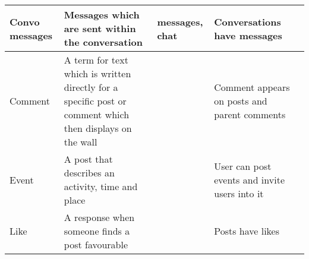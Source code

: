 \begin{center}
\begin{tabular}{| l | l | l | l | l |}
    Convo messages   & Messages which are sent within the conversation                                        & messages, chat                              &  Conversations have messages       \\ \hline
    Comment          & A term for text which is written directly for a specific post or comment which then displays on the wall &                                     & Comment appears on posts and parent comments  \\ \hline 
    Event            & A post that describes an activity, time and place                                                        &                                     & User can post events and invite users into it \\ \hline
    Like             & A response when someone finds a post favourable                                                          &                                     & Posts have likes                              \\ \hline
    \hline
    \end{tabular}
\end{center}

